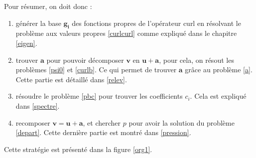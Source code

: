 Pour résumer, on doit donc :
\begin{enumerate}
\item générer la base $\mathbf{g_i}$ des fonctions propres de l'opérateur curl en résolvant le problème aux valeurs propres \ref{curlcurl} comme expliqué dans le chapitre \ref{eigen}.
\item trouver $\mathbf{a}$ pour pouvoir décomposer $\mathbf{v}$ en $\mathbf{u}+\mathbf{a}$, pour cela, on résout les problèmes \ref{psi0} et \ref{curlb}. Ce qui permet de trouver $\mathbf{a}$ grâce au problème \ref{a}. Cette partie est détaillé dans \ref{relev}.
\item résoudre le problème \ref{pbc} pour trouver les coefficients $c_i$. Cela est expliqué dans \ref{spectre}.
\item recomposer $\mathbf{v}=\mathbf{u}+\mathbf{a}$, et chercher $p$ pour avoir la solution du problème \ref{depart}. Cette dernière partie est montré dans \ref{pression}.
\end{enumerate}
Cette stratégie est présenté dans la figure \ref{org1}.
